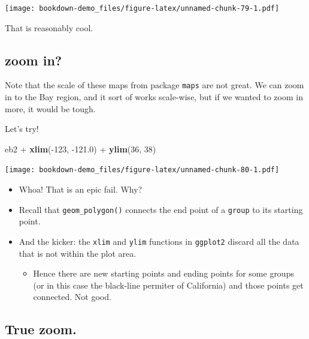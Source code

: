 \documentclass[]{book}
\newenvironment{Shaded}{\begin{snugshade}}{\end{snugshade}}
\newcommand{\KeywordTok}[1]{\textcolor[rgb]{0.13,0.29,0.53}{\textbf{{#1}}}}
\newcommand{\DecValTok}[1]{\textcolor[rgb]{0.00,0.00,0.81}{{#1}}}
\newcommand{\FloatTok}[1]{\textcolor[rgb]{0.00,0.00,0.81}{{#1}}}
\newcommand{\StringTok}[1]{\textcolor[rgb]{0.31,0.60,0.02}{{#1}}}
\newcommand{\NormalTok}[1]{{#1}}
\providecommand{\tightlist}{%
  \setlength{\itemsep}{0pt}\setlength{\parskip}{0pt}}
\theoremstyle{definition}
\theoremstyle{definition}
\theoremstyle{remark}
\begin{document}
\texttt{[image: bookdown-demo\_files/figure-latex/unnamed-chunk-79-1.pdf]}

That is reasonably cool.

\subsection{zoom in?}\label{zoom-in}

Note that the scale of these maps from package \texttt{maps} are not
great. We can zoom in to the Bay region, and it sort of works
scale-wise, but if we wanted to zoom in more, it would be tough.

Let's try!

\begin{Shaded}
\begin{Highlighting}[]
\NormalTok{eb2 +}\StringTok{ }\KeywordTok{xlim}\NormalTok{(-}\DecValTok{123}\NormalTok{, -}\FloatTok{121.0}\NormalTok{) +}\StringTok{ }\KeywordTok{ylim}\NormalTok{(}\DecValTok{36}\NormalTok{, }\DecValTok{38}\NormalTok{)}
\end{Highlighting}
\end{Shaded}

\texttt{[image: bookdown-demo\_files/figure-latex/unnamed-chunk-80-1.pdf]}

\begin{itemize}
\tightlist
\item
  Whoa! That is an epic fail. Why?
\item
  Recall that \texttt{geom\_polygon()} connects the end point of a
  \texttt{group} to its starting point.
\item
  And the kicker: the \texttt{xlim} and \texttt{ylim} functions in
  \texttt{ggplot2} discard all the data that is not within the plot
  area.

  \begin{itemize}
  \tightlist
  \item
    Hence there are new starting points and ending points for some
    groups (or in this case the black-line permiter of California) and
    those points get connected. Not good.
  \end{itemize}
\end{itemize}

\subsection{True zoom.}\label{true-zoom.}
\end{document}
